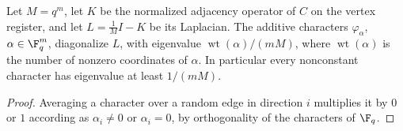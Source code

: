 \begin{lemma}\label{lem:hypercube-spectral-gap}
	\leanok
	Let $M=q^m$, let $K$ be the normalized adjacency operator of $C$ on the
	vertex register, and let $L=\frac1MI-K$ be its Laplacian.  The additive
	characters $\varphi_\alpha$, $\alpha\in\F_q^m$, diagonalize $L$, with
	eigenvalue $\operatorname{wt}(\alpha)/(mM)$, where $\operatorname{wt}(\alpha)$
	is the number of nonzero coordinates of $\alpha$.  In particular every
	nonconstant character has eigenvalue at least $1/(mM)$.
\end{lemma}
\begin{proof}
	\leanok
	Averaging a character over a random edge in direction $i$ multiplies it by
	$0$ or $1$ according as $\alpha_i\ne0$ or $\alpha_i=0$, by orthogonality of
	the characters of $\F_q$.
\end{proof}
